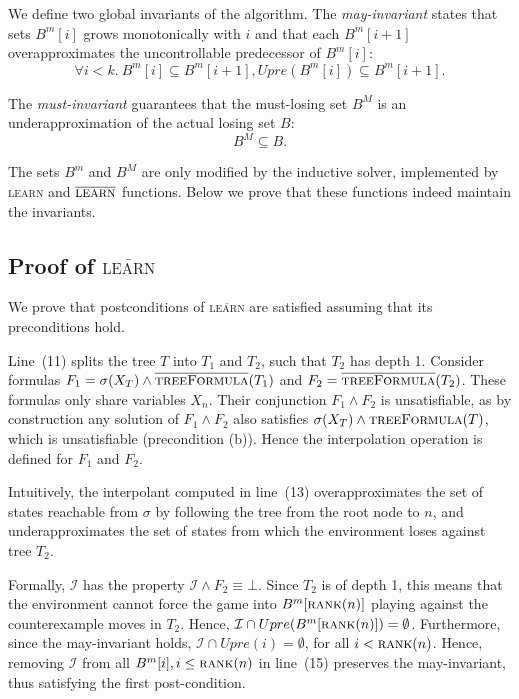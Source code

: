 \documentclass{llncs}
\newcommand{\II}{\mathcal{I}}
\newcommand{\textoverline}[1]{$\overline{\mbox{#1}}$}
\begin{document}
We define two global invariants of the algorithm.  The \emph{may-invariant}
states that sets $B^m[i]$ grows monotonically with $i$ and that each $B^m[i+1]$
overapproximates the uncontrollable predecessor of $B^m[i]$: $$\forall
i<k.~B^m[i] \subseteq B^m[i+1], Upre(B^m[i]) \subseteq B^m[i+1].$$

The \emph{must-invariant} guarantees that the must-losing set $B^M$ is an
underapproximation of the actual losing set $B$: $$B^M \subseteq B.$$

The sets $B^m$ and $B^M$ are only modified by the inductive solver, implemented
by \textsc{learn} and \textoverline{\textsc{learn}} functions.  Below we prove that these
functions indeed maintain the invariants.

\subsection{Proof of \textsc{\textoverline{learn}}}

We prove that postconditions of \textsc{\textoverline{learn}} are satisfied
assuming that its preconditions hold.

Line~(11) splits the tree $T$ into $T_1$ and $T_2$, such that $T_2$ has depth
1.  Consider formulas $F_1=\sigma(X_T) \land
\textsc{\textoverline{treeFormula}}(T_1)$ and $F_2 =
\textsc{\textoverline{treeFormula}}(T_2)$.  These formulas only share variables
$X_n$.  Their conjunction $F_1 \land F_2$ is unsatisfiable, as by construction
any solution of $F_1 \land F_2$ also satisfies $\sigma(X_T) \land
\textsc{treeFormula}(T)$, which is unsatisfiable (precondition (b)).  Hence the
interpolation operation is defined for $F_1$ and $F_2$.  

Intuitively, the interpolant computed in line~(13) overapproximates the set of
states reachable from $\sigma$ by following the tree from the root node to $n$,
and underapproximates the set of states from which the environment loses
against tree $T_2$.  

Formally, $\II$ has the property $\II \land F_2 \equiv \bot$.  Since $T_2$ is
of depth 1, this means that the environment cannot force the game into
$B^m[\textsc{rank}(n)]$ playing against the counterexample moves in $T_2$.
Hence, $\II \cap Upre(B^m[\textsc{rank}(n)]) = \emptyset$.  Furthermore, since
the may-invariant holds, $\II \cap Upre(i) = \emptyset$, for all $i <
\textsc{rank}(n)$.  Hence, removing $\II$ from all $B^m[i], i\leq
\textsc{rank}(n)$ in line~(15) preserves the may-invariant, thus satisfying the
first post-condition.
\end{document}
